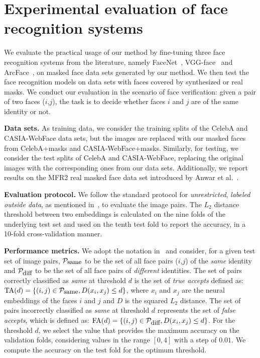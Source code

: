 \documentclass{article}
\begin{document}
\section{Experimental evaluation of face recognition systems}

We evaluate the practical usage of our method by fine-tuning three face recognition systems from the literature, namely FaceNet~\cite{Schroff15CVPR}, VGG-face~\cite{Parkhi15BMVC} and ArcFace~\cite{Deng19CVPR}, on masked face data sets generated by our method.  
We then test the face recognition models on data sets with faces covered by synthesized or real masks. We conduct our evaluation in the scenario of face verification: given a pair of two faces ($i$,$j$), the task is to decide whether faces $i$ and $j$ are of the same identity or not. 

{\bf Data sets.} As training data, we consider the training splits of the CelebA and CASIA-WebFace data sets, but the images are replaced with our masked faces from CelebA+masks and CASIA-WebFace+masks. Similarly, for testing, we consider the test splits of CelebA and CASIA-WebFace, replacing the original images with the corresponding ones from our data sets. Additionally, we report results on the MFR2 real masked face data set introduced by Anwar et al.~\cite{anwar2020arxiv}.

{\bf Evaluation protocol.} We follow the standard protocol for {\emph {unrestricted}}, {\emph{labeled outside data}}, as mentioned in~\cite{Huang07Tech}, to evaluate the image pairs. The $L_2$ distance threshold between two embeddings is calculated on the nine folds of the underlying test set and used on the tenth test fold to report the accuracy, in a 10-fold cross-validation manner.

{\bf Performance metrics.} We adopt the notation in~\cite{Schroff15CVPR} and consider, for a given test set of image pairs, $\mathcal{P}_{\mbox{\small{same}}}$ to be the set of all face pairs ($i$,$j$) of the {\emph {same}} identity and $\mathcal{P}_{\mbox{\small{diff}}}$ to be the set of all face pairs of {\emph {different}} identities. The set of pairs correctly classified as {\emph {same}} at threshold $d$ is the set of {\emph {true accepts}} defined as: $\mbox{TA}(d) = \{(i,j) \in {\mathcal{P}}_{\mbox{\small{same}}}, D(x_i,x_j ) \leq d \}$, where $x_i$ and $x_j$ are the neural embeddings of the faces $i$ and $j$ and $D$ is the squared $L_2$ distance. The set of pairs incorrectly classified as {\emph {same}} at threshold $d$ represents the set of {\emph {false accepts}}, which is defined as: $\mbox{FA}(d) = \{(i,j) \in {\mathcal{P}}_{\mbox{\small{diff}}}, D(x_i,x_j ) \leq d \}$. For the threshold $d$, we select the value that provides the maximum accuracy on the validation folds, considering values in the range $[0,4]$ with a step of $0.01$. We compute the accuracy on the test fold for the optimum threshold.
\end{document}
